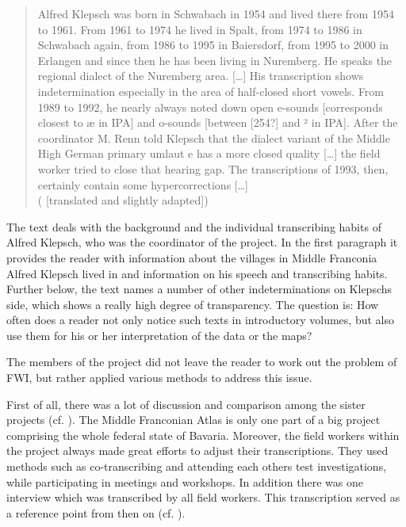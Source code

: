 \documentclass[output=paper]{LSP/langsci}
\begin{document}
\begin{quote}
Alfred Klepsch was born in Schwabach in 1954 and lived there from 1954 to 1961. From 1961 to 1974 he lived in Spalt, from 1974 to 1986 in Schwabach again, from 1986 to 1995 in Baiersdorf, from 1995 to 2000 in Erlangen and since then he has been living in Nuremberg. He speaks the regional dialect of the Nuremberg area. […] His transcription shows indetermination especially in the area of half-closed short vowels. From 1989 to 1992, he nearly always noted down open e-sounds [corresponds closest to æ in IPA] and o-sounds [between [254?] and ² in IPA]. After the coordinator M. Renn told Klepsch that the dialect variant of the Middle High German primary umlaut e has a more closed quality […] the field worker tried to close that {\textquotedbl}hearing gap{\textquotedbl}. The transcriptions of 1993, then, certainly contain some hypercorrections […]\\(\citealt[47]{klepsch_sprachatlas_2013} [translated and slightly adapted])
\end{quote}

The text deals with the background and the individual transcribing habits of Alfred Klepsch, who was the coordinator of the project. In the first paragraph it provides the reader with information about the villages in Middle Franconia Alfred Klepsch lived in and information on his speech and transcribing habits. Further below, the text names a number of other indeterminations on Klepsch{\textquotesingle}s side, which shows a really high degree of transparency. The question is: How often does a reader not only notice such texts in introductory volumes, but also use them for his or her interpretation of the data or the maps?

The members of the project did not leave the reader to work out the problem of FWI, but rather applied various methods to address this issue.

First of all, there was a lot of discussion and comparison among the sister projects (cf. \citealt[25 ff.]{klepsch_wie_2013}). The Middle Franconian Atlas is only one part of a big project comprising the whole federal state of Bavaria. Moreover, the field workers within the project always made great efforts to adjust their transcriptions. They used methods such as co-transcribing and attending each other{\textquotesingle}s test investigations, while participating in meetings and workshops. In addition there was one interview which was transcribed by all field workers. This transcription served as a reference point from then on (cf. \citealt[26]{klepsch_wie_2013}).
\end{document}

